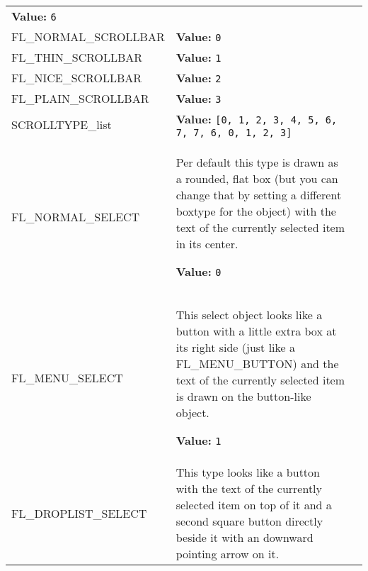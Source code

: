 \begin{longtable}{|p{\varnamewidth}|p{\vardescrwidth}|l}
\textbf{Value:} 
{\tt 6}&\\
\cline{1-2}
\raggedright F\-L\-\_\-N\-O\-R\-M\-A\-L\-\_\-S\-C\-R\-O\-L\-L\-B\-A\-R\- & \raggedright \textbf{Value:} 
{\tt 0}&\\
\cline{1-2}
\raggedright F\-L\-\_\-T\-H\-I\-N\-\_\-S\-C\-R\-O\-L\-L\-B\-A\-R\- & \raggedright \textbf{Value:} 
{\tt 1}&\\
\cline{1-2}
\raggedright F\-L\-\_\-N\-I\-C\-E\-\_\-S\-C\-R\-O\-L\-L\-B\-A\-R\- & \raggedright \textbf{Value:} 
{\tt 2}&\\
\cline{1-2}
\raggedright F\-L\-\_\-P\-L\-A\-I\-N\-\_\-S\-C\-R\-O\-L\-L\-B\-A\-R\- & \raggedright \textbf{Value:} 
{\tt 3}&\\
\cline{1-2}
\raggedright S\-C\-R\-O\-L\-L\-T\-Y\-P\-E\-\_\-l\-i\-s\-t\- & \raggedright \textbf{Value:} 
{\tt \texttt{[}0\texttt{, }1\texttt{, }2\texttt{, }3\texttt{, }4\texttt{, }5\texttt{, }6\texttt{, }7\texttt{, }7\texttt{, }6\texttt{, }0\texttt{, }1\texttt{, }2\texttt{, }3\texttt{]}}&\\
\cline{1-2}
\raggedright F\-L\-\_\-N\-O\-R\-M\-A\-L\-\_\-S\-E\-L\-E\-C\-T\- & \raggedright Per default this type is drawn as a rounded, flat box (but you can change
that by setting a different boxtype for the object) with the text of the
currently selected item in its center.

\textbf{Value:} 
{\tt 0}&\\
\cline{1-2}
\raggedright F\-L\-\_\-M\-E\-N\-U\-\_\-S\-E\-L\-E\-C\-T\- & \raggedright This select object looks like a button with a little extra box at its right
side (just like a FL\_MENU\_BUTTON) and the text of the currently selected item
is drawn on the button-like object.

\textbf{Value:} 
{\tt 1}&\\
\cline{1-2}
\raggedright F\-L\-\_\-D\-R\-O\-P\-L\-I\-S\-T\-\_\-S\-E\-L\-E\-C\-T\- & \raggedright This type looks like a button with the text of the currently selected item
on top of it and a second square button directly beside it with an downward
pointing arrow on it.


\end{longtable}
